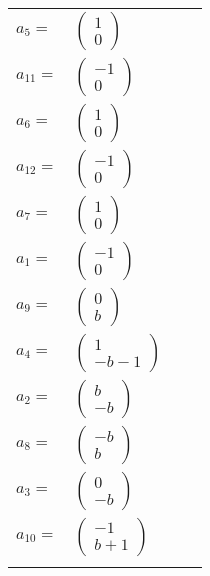 \documentclass[1p]{elsarticle_modified}
\theoremstyle{definition}
\begin{document}
\begin{tabular}{m{7pt} m{180pt} m{7pt} m{180pt} }
\flushright $a_{5}=$&$\begin{pmatrix}1\\0\end{pmatrix}$ \\
\flushright $a_{11}=$&$\begin{pmatrix}-1\\0\end{pmatrix}$ \\
\flushright $a_{6}=$&$\begin{pmatrix}1\\0\end{pmatrix}$ \\
\flushright $a_{12}=$&$\begin{pmatrix}-1\\0\end{pmatrix}$ \\
\flushright $a_{7}=$&$\begin{pmatrix}1\\0\end{pmatrix}$ \\
\flushright $a_{1}=$&$\begin{pmatrix}-1\\0\end{pmatrix}$ \\
\flushright $a_{9}=$&$\begin{pmatrix}0\\b\end{pmatrix}$ \\
\flushright $a_{4}=$&$\begin{pmatrix}1\\- b-1\end{pmatrix}$ \\
\flushright $a_{2}=$&$\begin{pmatrix}b\\- b\end{pmatrix}$ \\
\flushright $a_{8}=$&$\begin{pmatrix}- b\\b\end{pmatrix}$ \\
\flushright $a_{3}=$&$\begin{pmatrix}0\\- b\end{pmatrix}$ \\
\flushright $a_{10}=$&$\begin{pmatrix}-1\\b+1\end{pmatrix}$\\&\end{tabular}
\end{document}

